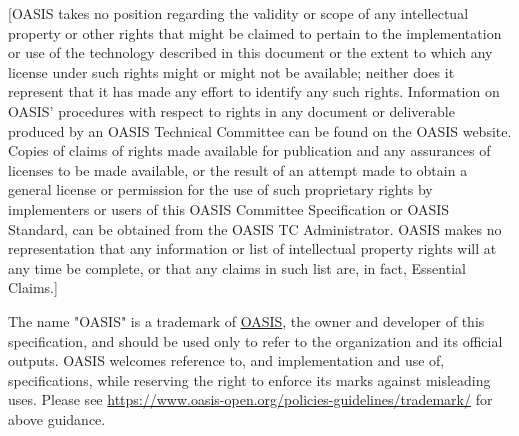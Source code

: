 \begin{titlepage}

[OASIS takes no position regarding the validity or scope of any
intellectual property or other rights that might be claimed to pertain
to the implementation or use of the technology described in this
document or the extent to which any license under such rights might or
might not be available; neither does it represent that it has made any
effort to identify any such rights. Information on OASIS' procedures
with respect to rights in any document or deliverable produced by an
OASIS Technical Committee can be found on the OASIS website. Copies of
claims of rights made available for publication and any assurances of
licenses to be made available, or the result of an attempt made to
obtain a general license or permission for the use of such proprietary
rights by implementers or users of this OASIS Committee Specification
or OASIS Standard, can be obtained from the OASIS TC Administrator.
OASIS makes no representation that any information or list of
intellectual property rights will at any time be complete, or that any
claims in such list are, in fact, Essential Claims.]

The name "OASIS" is a trademark of \href{https://www.oasis-open.org/}{OASIS}, the owner and developer of
this specification, and should be used only to refer to the
organization and its official outputs. OASIS welcomes reference to,
and implementation and use of, specifications, while reserving the
right to enforce its marks against misleading uses. Please see
\url{https://www.oasis-open.org/policies-guidelines/trademark/} for above guidance.
\\\\

\end{titlepage}
